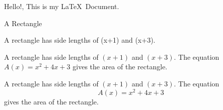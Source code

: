 \documentclass[11pt]{article}
\begin{document}
Hello!, This is my \LaTeX\ Document.

A Rectangle

A rectangle has side lengths of (x+1) and (x+3).



A rectangle has side lengths of $(x+1)$ and $(x+3)$.
The equation ${A(x)=x^2+4x+3}$ gives the area of the rectangle.


A rectangle has side lengths of $(x+1)$ and $(x+3)$.
The equation $${A(x)=x^2+4x+3}$$ gives the area of the rectangle.
\end{document}
